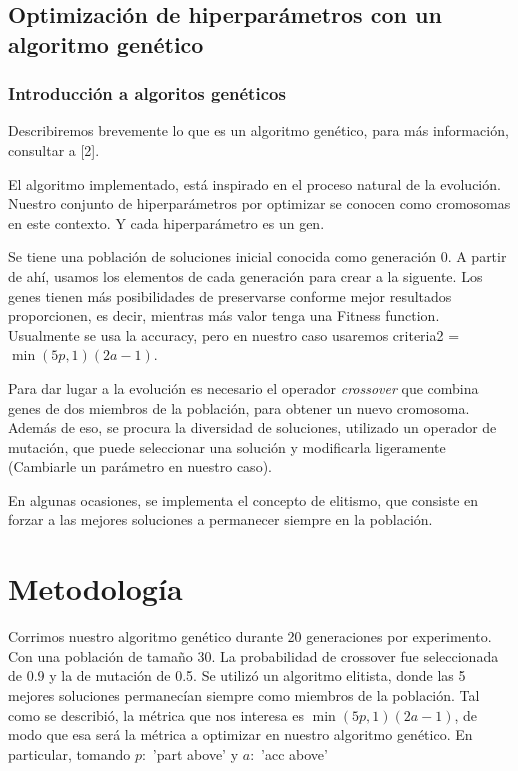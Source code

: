 \documentclass[11pt]{article}
\begin{document}
\subsection{Optimización de hiperparámetros con un algoritmo genético}
\subsubsection{Introducción a algoritos genéticos}
Describiremos brevemente lo que es un algoritmo genético, para más información, consultar a [2].

El algoritmo implementado, está inspirado en el proceso natural de la evolución. Nuestro conjunto de hiperparámetros por optimizar se conocen como cromosomas en este contexto. Y cada hiperparámetro es un gen.

Se tiene una población de soluciones inicial conocida como generación 0. A partir de ahí, usamos los elementos de cada generación para crear a la siguente. Los genes tienen más posibilidades de preservarse conforme mejor resultados proporcionen, es decir, mientras más valor tenga una Fitness function. Usualmente se usa la accuracy, pero en nuestro caso usaremos criteria2 = $\min(5p,1)(2a-1)$.

Para dar lugar a la evolución es necesario el operador \textsl{crossover} que combina genes de dos miembros de la población, para obtener un nuevo cromosoma. Además de eso, se procura la diversidad de soluciones, utilizado un operador de mutación, que puede seleccionar una solución y modificarla ligeramente (Cambiarle un parámetro en nuestro caso).  

En algunas ocasiones, se implementa el concepto de elitismo, que consiste en forzar a las mejores soluciones a permanecer siempre en la población.

\section{Metodología}
Corrimos nuestro algoritmo genético durante 20 generaciones por experimento. Con una población de tamaño 30. La probabilidad de crossover fue seleccionada de 0.9 y la de mutación de 0.5. Se utilizó un algoritmo elitista, donde las 5 mejores soluciones permanecían siempre como miembros de la población. Tal como se describió, la métrica que nos interesa es $\min(5p,1)(2a-1)$, de modo que esa será la métrica a optimizar en nuestro algoritmo genético. En particular, tomando $p:$ 'part above' y $a:$ 'acc above'
\end{document}
